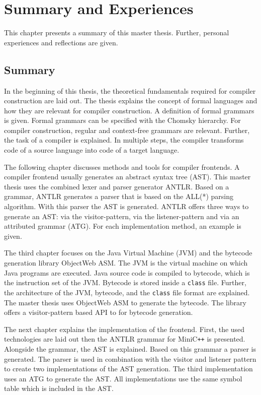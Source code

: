 \chapter{Summary and Experiences}

This chapter presents a summary of this master thesis. Further, personal experiences and reflections are given. 

\section{Summary}

In the beginning of this thesis, the theoretical fundamentals required for compiler construction are laid out. The thesis explains the concept of formal languages and how they are relevant for compiler construction. A definition of formal grammars is given. Formal grammars can be specified with the Chomsky hierarchy. For compiler construction, regular and context-free grammars are relevant. Further, the task of a compiler is explained. In multiple steps, the compiler transforms code of a source language into code of a target language.

The following chapter discusses methods and tools for compiler frontends. A compiler frontend usually generates an abstract syntax tree (AST). This master thesis uses the combined lexer and parser generator ANTLR. Based on a grammar, ANTLR generates a parser that is based on the ALL(*) parsing algorithm. With this parser the AST is generated. ANTLR offers three ways to generate an AST: via the visitor-pattern, via the listener-pattern and via an attributed grammar (ATG). For each implementation method, an example is given. 

The third chapter focuses on the Java Virtual Machine (JVM) and the bytecode generation library ObjectWeb ASM. The JVM is the virtual machine on which Java programs are executed. Java source code is compiled to bytecode, which is the instruction set of the JVM. Bytecode is stored inside a \verb|class| file. Further, the architecture of the JVM, bytecode, and the \verb|class| file format are explained. The master thesis uses ObjectWeb ASM to generate the bytecode. The library offers a visitor-pattern based API to for bytecode generation. 

The next chapter explains the implementation of the frontend. First, the used technologies are laid out then the ANTLR grammar for MiniC\verb|++| is presented. Alongside the grammar, the AST is explained. Based on this grammar a parser is generated. The parser is used in combination with the visitor and listener pattern to create two implementations of the AST generation. The third implementation uses an ATG to generate the AST. All implementations use the same symbol table which is included in the AST.

